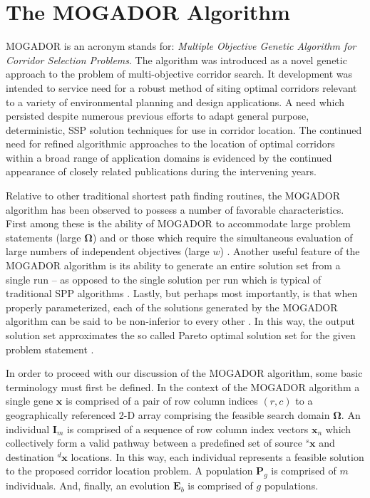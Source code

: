 \section{The MOGADOR Algorithm}
            
MOGADOR is an acronym stands for: \textit{Multiple Objective Genetic Algorithm for Corridor Selection Problems}. \cite{Zhang2008} The algorithm was introduced as a novel genetic approach to the problem of multi-objective corridor search. \cite{Mooney2006, Zhang2008} It development was intended to service need for a robust method of siting optimal corridors relevant to a variety of environmental planning and design applications. \cite{Bennett2004, Chakhar2003, Zhou1996} A need which persisted despite numerous previous efforts to adapt general purpose, deterministic, SSP solution techniques for use in corridor location. \cite{Hallam2001, Jankowski1995, Lombard1993} The continued need for refined algorithmic approaches to the location of optimal corridors within a broad range of application domains is evidenced by the continued appearance of closely related publications during the intervening years. \cite{Aissi2012, Mousseau2010, Neema2010, Roberts2010, Scaparra2014, Tsai2011} 

Relative to other traditional shortest path finding routines, the MOGADOR algorithm has been observed to possess a number of favorable characteristics. First among these is the ability of MOGADOR to accommodate large problem statements (large $\boldsymbol{\Omega}$) and or those which require the simultaneous evaluation of large numbers of independent objectives (large $w$) \cite{Pangilinan2007, Zhang2008}. Another useful feature of the MOGADOR algorithm is its ability to generate an entire solution set from a single run -- as opposed to the single solution per run which is typical of traditional SPP algorithms \cite{Cherkassky1996, Dreyfus1969, Hart1968, Zhang2008}. Lastly, but perhaps most importantly, is that when properly parameterized, each of the solutions generated by the MOGADOR algorithm can be said to be non-inferior to every other \cite{Zhang2008}. In this way, the output solution set approximates the so called Pareto optimal solution set for the given problem statement \cite{Deb2014}.  

In order to proceed with our discussion of the MOGADOR algorithm, some basic terminology must first be defined. In the context of the MOGADOR algorithm a single gene $\textbf{x}$ is comprised of a pair of row column indices $(r,c)$ to a geographically referenced 2-D array comprising the feasible search domain $\boldsymbol{\Omega}$. An individual $\textbf{I}_m$ is comprised of a sequence of row column index vectors $\textbf{x}_n$ which collectively form a valid pathway between a predefined set of source ${}^{s}\textbf{x}$ and destination ${}^{d}\textbf{x}$ locations. In this way, each individual represents a feasible solution to the proposed corridor location problem. A population $\textbf{P}_g$ is comprised of $m$ individuals. And, finally, an evolution $\textbf{E}_b$ is comprised of $g$ populations.

